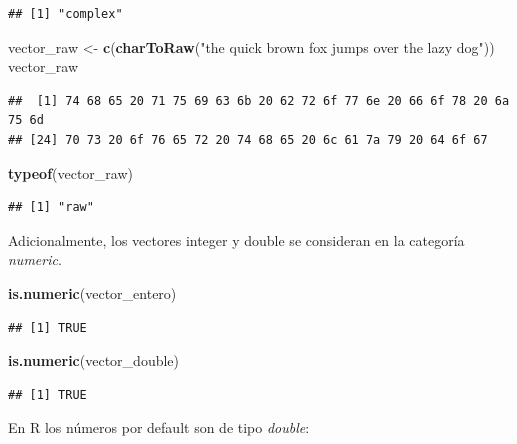 \documentclass[]{book}
\newenvironment{Shaded}{\begin{snugshade}}{\end{snugshade}}
\newcommand{\KeywordTok}[1]{\textcolor[rgb]{0.13,0.29,0.53}{\textbf{#1}}}
\newcommand{\StringTok}[1]{\textcolor[rgb]{0.31,0.60,0.02}{#1}}
\newcommand{\NormalTok}[1]{#1}
\theoremstyle{definition}
\theoremstyle{definition}
\theoremstyle{definition}
\theoremstyle{remark}
\begin{document}
\begin{verbatim}
## [1] "complex"
\end{verbatim}

\begin{Shaded}
\begin{Highlighting}[]
\NormalTok{vector_raw <-}\StringTok{ }\KeywordTok{c}\NormalTok{(}\KeywordTok{charToRaw}\NormalTok{(}\StringTok{"the quick brown fox jumps over the lazy dog"}\NormalTok{))}
\NormalTok{vector_raw}
\end{Highlighting}
\end{Shaded}

\begin{verbatim}
##  [1] 74 68 65 20 71 75 69 63 6b 20 62 72 6f 77 6e 20 66 6f 78 20 6a 75 6d
## [24] 70 73 20 6f 76 65 72 20 74 68 65 20 6c 61 7a 79 20 64 6f 67
\end{verbatim}

\begin{Shaded}
\begin{Highlighting}[]
\KeywordTok{typeof}\NormalTok{(vector_raw)}
\end{Highlighting}
\end{Shaded}

\begin{verbatim}
## [1] "raw"
\end{verbatim}

Adicionalmente, los vectores integer y double se consideran en la
categoría \emph{numeric}.

\begin{Shaded}
\begin{Highlighting}[]
\KeywordTok{is.numeric}\NormalTok{(vector_entero)}
\end{Highlighting}
\end{Shaded}

\begin{verbatim}
## [1] TRUE
\end{verbatim}

\begin{Shaded}
\begin{Highlighting}[]
\KeywordTok{is.numeric}\NormalTok{(vector_double)}
\end{Highlighting}
\end{Shaded}

\begin{verbatim}
## [1] TRUE
\end{verbatim}

En R los números por default son de tipo \emph{double}:
\end{document}
